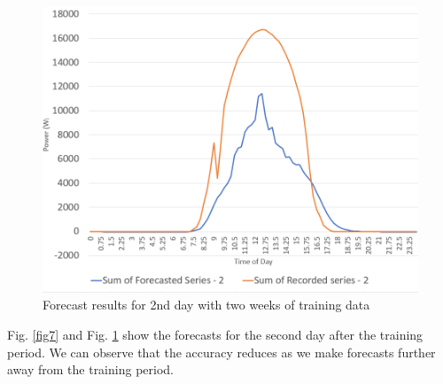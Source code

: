 \documentclass[journal]{IEEEtran}
\begin{document}
\begin{figure}[htpb]
	\centering
	\includegraphics[scale=0.35]{ForecastTwoWeekDayTwo.png}
	\caption{Forecast results for 2nd day with two weeks of training data}
	\label{fig8} %
\end{figure}

Fig. \ref{fig7} and Fig. \ref{fig8} show the forecasts for the second day after the training period. We can observe that the accuracy reduces as we make forecasts further away from the training period.

%
%
\end{document}
